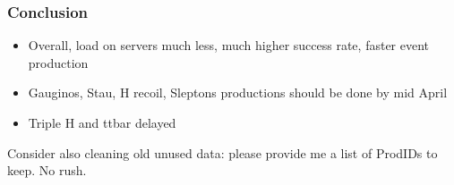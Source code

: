 \documentclass{beamer}
\begin{document}
\begin{frame}
\frametitle{Conclusion}
\begin{itemize}
  \item Overall, load on servers much less, much higher success rate, faster
  event production
  \item Gauginos, Stau, H recoil, Sleptons productions should be done by mid
  April
  \item Triple H and ttbar delayed
\end{itemize}

Consider also cleaning old unused data: please provide me a list of ProdIDs to
keep. No rush.
\end{frame}
\end{document}
